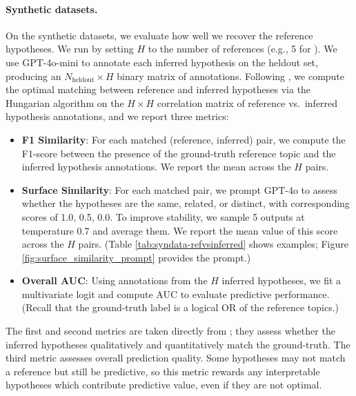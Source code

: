 \paragraph{Synthetic datasets.} On the synthetic datasets, we evaluate how well we recover the reference hypotheses.
We run \ourmethod by setting $H$ to the number of references (e.g., 5 for ).
We use GPT-4o-mini to annotate each inferred hypothesis on the heldout set, producing an $N_\text{heldout} \times H$ binary matrix of annotations.
Following \citet{zhong_explaining_2024}, we compute the optimal matching between reference and inferred hypotheses via the Hungarian algorithm on the $H \times H$ correlation matrix of reference vs.~inferred hypothesis annotations, and we report three metrics:
\begin{itemize}
    \item \textbf{F1 Similarity}: For each matched (reference, inferred) pair, we compute the F1-score between the presence of the ground-truth reference topic and the inferred hypothesis annotations. 
    We report the mean across the $H$ pairs.
    
    \item \textbf{Surface Similarity}: For each matched pair, we prompt GPT-4o to assess whether the hypotheses are the same, related, or distinct, with corresponding scores of 1.0, 0.5, 0.0. 
    To improve stability, we sample 5 outputs at temperature 0.7 and average them.
    We report the mean value of this score across the $H$ pairs. (Table \ref{tab:syndata-refvsinferred} shows examples; Figure \ref{fig:surface_similarity_prompt} provides the prompt.)
    
    \item \textbf{Overall AUC}: Using annotations from the $H$ inferred hypotheses, we fit a multivariate logit and compute AUC to evaluate predictive performance. 
    (Recall that the ground-truth label is a logical OR of the reference topics.)
\end{itemize}

The first and second metrics are taken directly from \citet{zhong_explaining_2024}; they assess whether the inferred hypotheses qualitatively and quantitatively match the ground-truth. 
The third metric assesses overall prediction quality. 
Some hypotheses may not match a reference but still be predictive, so this metric rewards any interpretable hypotheses which contribute predictive value, even if they are not optimal.

